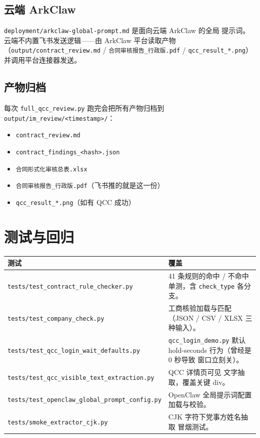 \documentclass[11pt,a4paper]{article}
\begin{document}
\subsection{云端 ArkClaw}

\texttt{deployment/arkclaw-global-prompt.md} 是面向云端 ArkClaw 的全局
提示词。云端不内置飞书发送逻辑——由 ArkClaw 平台读取产物
（\texttt{output/contract\_review.md} / \texttt{合同审核报告\_行政版.pdf}
/ \texttt{qcc\_result\_*.png}）并调用平台连接器发送。

\subsection{产物归档}

每次 \texttt{full\_qcc\_review.py} 跑完会把所有产物归档到
\texttt{output/im\_review/<timestamp>/}：

\begin{itemize}[leftmargin=1.4em,itemsep=1pt]
  \item \texttt{contract\_review.md}
  \item \texttt{contract\_findings\_<hash>.json}
  \item \texttt{合同形式化审核总表.xlsx}
  \item \texttt{合同审核报告\_行政版.pdf}（飞书推的就是这一份）
  \item \texttt{qcc\_result\_*.png}（如有 QCC 成功）
\end{itemize}

\section{测试与回归}

\begin{longtable}{p{6.5cm} p{8.5cm}}
\toprule
\textbf{测试} & \textbf{覆盖} \\ \midrule
\endhead
\texttt{tests/test\_contract\_rule\_checker.py} & 41 条规则的命中 / 不命中
单测，含 \texttt{check\_type} 各分支。 \\
\texttt{tests/test\_company\_check.py} & 工商核验加载与匹配（JSON / CSV /
XLSX 三种输入）。 \\
\texttt{tests/test\_qcc\_login\_wait\_defaults.py} &
\texttt{qcc\_login\_demo.py} 默认 hold-seconds 行为（曾经是 0 秒导致
窗口立刻关）。 \\
\texttt{tests/test\_qcc\_visible\_text\_extraction.py} & QCC 详情页可见
文字抽取，覆盖关键 div。 \\
\texttt{tests/test\_openclaw\_global\_prompt\_config.py} & OpenClaw
全局提示词配置加载与校验。 \\
\texttt{tests/smoke\_extractor\_cjk.py} & CJK 字符下党事方姓名抽取
冒烟测试。 \\
\bottomrule
\end{longtable}
\end{document}

